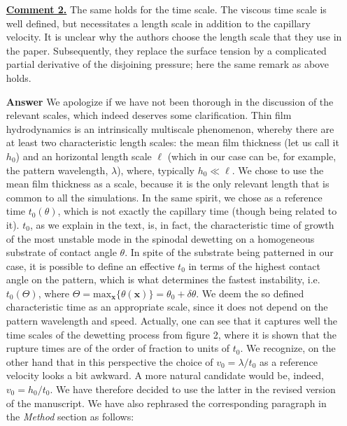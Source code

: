 \documentclass[12pt,english]{article}
\begin{document}
\begin{itemize}
\item[ \textbf{\underline{Comment 2.}}] 
{
The same holds for the time scale. 
The viscous time scale is well defined, but necessitates a length scale in addition to the 
capillary velocity. It is unclear why the authors choose the length scale that they use in the paper.
Subsequently, they replace the surface tension by a complicated partial derivative of the 
disjoining pressure; here the same remark as above holds.
}

\item[ \textbf{{Answer}}]
{
We apologize if we have not been thorough in the discussion of the relevant scales, which indeed deserves some clarification. 
Thin film hydrodynamics is an intrinsically multiscale phenomenon, whereby there are at least two characteristic length scales: the mean film thickness (let us call it $h_0$)
and an horizontal length scale $\ell$ (which in our case can be, for example, the pattern wavelength, $\lambda$), where, typically $h_0 \ll \ell$. We chose to use the mean 
film thickness as a scale, because it is the only relevant length that is common to all the simulations.
In the same spirit, we chose as a reference time $t_0(\theta)$, which is not exactly the capillary time (though being related to it). 
$t_0$, as we explain in the text, is, in fact, the characteristic time of growth of the most unstable mode in the spinodal dewetting on a homogeneous
substrate of contact angle $\theta$. In spite of the substrate being patterned in our case, it is possible to define an effective $t_0$ in terms 
of the highest contact angle on the pattern, which is what determines the fastest instability, i.e. $t_0(\Theta)$, where 
$\Theta=\mbox{max}_{\mathbf{x}}\{\theta(\mathbf{x})\}= \theta_0 + \delta \theta$. We deem the so defined characteristic time as an appropriate scale,
since it does not depend on the pattern wavelength and speed. Actually, one can see that it captures well the time scales of the dewetting process
from figure 2, where it is shown that the rupture times are of the order of fraction to units of $t_0$.
We recognize, on the other hand that in this perspective the choice of $v_0 = \lambda/t_0$ as a reference velocity looks a bit awkward.
A more natural candidate would be, indeed, $v_0=h_0/t_0$. We have therefore decided to use the latter in the revised version of the manuscript.
We have also rephrased the corresponding paragraph in the {\it Method} section as follows: \\

}
\end{itemize}
\end{document}

